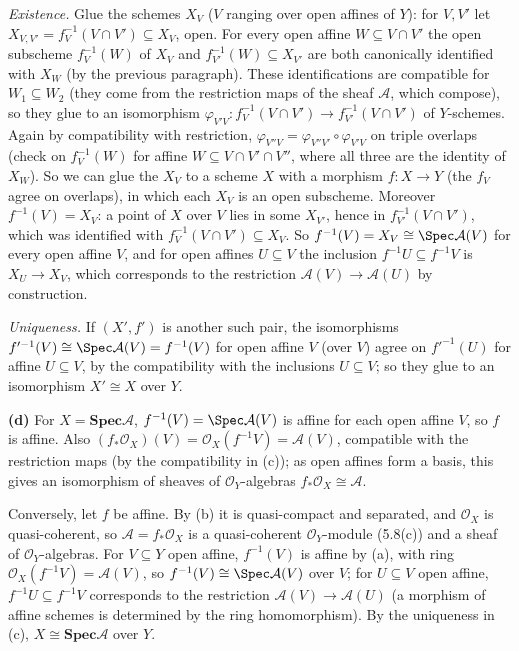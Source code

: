 \documentclass[11pt]{article}
\begin{document}
\emph{Existence.} Glue the schemes $X_V$ ($V$ ranging over open affines of $Y$): for $V,V'$ let $X_{V,V'}=f_V^{-1}(V\cap V')\subseteq X_V$, open. For every open affine $W\subseteq V\cap V'$ the open subscheme $f_V^{-1}(W)$ of $X_V$ and $f_{V'}^{-1}(W)\subseteq X_{V'}$ are both canonically identified with $X_W$ (by the previous paragraph). These identifications are compatible for $W_1\subseteq W_2$ (they come from the restriction maps of the sheaf $\mathcal A$, which compose), so they glue to an isomorphism $\varphi_{V'V}:f_V^{-1}(V\cap V')\to f_{V'}^{-1}(V\cap V')$ of $Y$-schemes. Again by compatibility with restriction, $\varphi_{V''V}=\varphi_{V''V'}\circ\varphi_{V'V}$ on triple overlaps (check on $f_V^{-1}(W)$ for affine $W\subseteq V\cap V'\cap V''$, where all three are the identity of $X_W$). So we can glue the $X_V$ to a scheme $X$ with a morphism $f:X\to Y$ (the $f_V$ agree on overlaps), in which each $X_V$ is an open subscheme. Moreover $f^{-1}(V)=X_V$: a point of $X$ over $V$ lies in some $X_{V'}$, hence in $f_{V'}^{-1}(V\cap V')$, which was identified with $f_V^{-1}(V\cap V')\subseteq X_V$. So $f^{-1}(V)=X_V\cong\Spec\mathcal A(V)$ for every open affine $V$, and for open affines $U\subseteq V$ the inclusion $f^{-1}U\subseteq f^{-1}V$ is $X_U\to X_V$, which corresponds to the restriction $\mathcal A(V)\to\mathcal A(U)$ by construction.

\emph{Uniqueness.} If $(X',f')$ is another such pair, the isomorphisms $f'^{-1}(V)\cong\Spec\mathcal A(V)=f^{-1}(V)$ for open affine $V$ (over $V$) agree on $f'^{-1}(U)$ for affine $U\subseteq V$, by the compatibility with the inclusions $U\subseteq V$; so they glue to an isomorphism $X'\cong X$ over $Y$.

\textbf{(d)} For $X=\mathbf{Spec}\mathcal A$, $f^{-1}(V)=\Spec\mathcal A(V)$ is affine for each open affine $V$, so $f$ is affine. Also $(f_*\mathcal O_X)(V)=\mathcal O_X(f^{-1}V)=\mathcal A(V)$, compatible with the restriction maps (by the compatibility in (c)); as open affines form a basis, this gives an isomorphism of sheaves of $\mathcal O_Y$-algebras $f_*\mathcal O_X\cong\mathcal A$.

Conversely, let $f$ be affine. By (b) it is quasi-compact and separated, and $\mathcal O_X$ is quasi-coherent, so $\mathcal A=f_*\mathcal O_X$ is a quasi-coherent $\mathcal O_Y$-module (5.8(c)) and a sheaf of $\mathcal O_Y$-algebras. For $V\subseteq Y$ open affine, $f^{-1}(V)$ is affine by (a), with ring $\mathcal O_X(f^{-1}V)=\mathcal A(V)$, so $f^{-1}(V)\cong\Spec\mathcal A(V)$ over $V$; for $U\subseteq V$ open affine, $f^{-1}U\subseteq f^{-1}V$ corresponds to the restriction $\mathcal A(V)\to\mathcal A(U)$ (a morphism of affine schemes is determined by the ring homomorphism). By the uniqueness in (c), $X\cong\mathbf{Spec}\mathcal A$ over $Y$.
\end{document}
